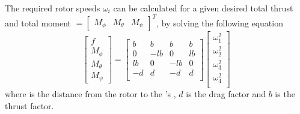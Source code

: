 The required rotor speeds $ \omega_i $ can be calculated for a given desired total thrust  and total moment $=\begin{bmatrix}	M_\phi&M_\theta&M_\psi	\end{bmatrix}^T  $, by solving the following equation
\begin{equation}\label{eq:omega_i}
\begin{bmatrix}
f\\M_\phi\\M_\theta\\M_\psi
\end{bmatrix}=
\begin{bmatrix}
b&b&b&b\\
0&-lb&0&lb\\
lb&0&-lb&0\\
-d&d&-d&d\\
\end{bmatrix}
\begin{bmatrix}
\omega_1^2\\
\omega_2^2\\
\omega_3^2\\
\omega_4^2\\
\end{bmatrix}
\end{equation}
where  is the distance from the rotor to the 's , $ d $ is the drag factor and $ b $ is the thrust factor. 


